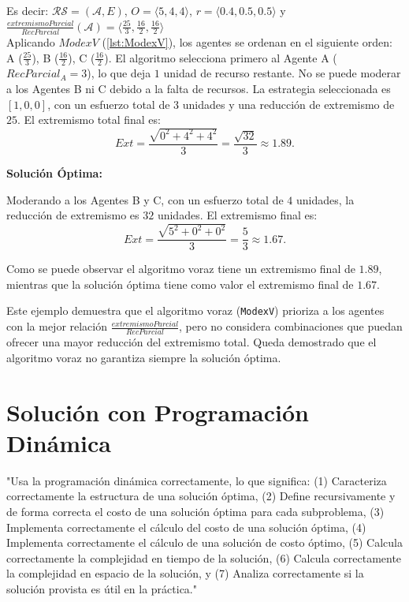 \documentclass[letterpaper,10pt]{article}
\begin{document}
Es decir: $\mathcal{R} \mathcal{S} = (\mathcal{A},E)$, $O=\langle 5,4,4 \rangle$, $r=\langle 0.4, 0.5, 0.5\rangle$ y $\frac{extremismoParcial}{RecParcial}(\mathcal{A})=\langle \frac{25}{3},\frac{16}{2},\frac{16}{2} \rangle $
\\

Aplicando $ModexV$ (\ref{lst:ModexV}), los agentes se ordenan en el siguiente orden: A ($\frac{25}{3}$), B ($\frac{16}{2}$), C ($\frac{16}{2}$). El algoritmo selecciona primero al Agente A (\(RecParcial_A = 3\)), lo que deja \(1\) unidad de recurso restante. No se puede moderar a los Agentes B ni C debido a la falta de recursos. La estrategia seleccionada es \([1, 0, 0]\), con un esfuerzo total de \(3\) unidades y una reducción de extremismo de \(25\). El extremismo total final es:
\[
Ext = \frac{\sqrt{0^2 + 4^2 + 4^2}}{3} = \frac{\sqrt{32}}{3} \approx 1.89.
\]

\textbf{Solución Óptima:}  

Moderando a los Agentes B y C, con un esfuerzo total de \(4\) unidades, la reducción de extremismo es \(32\) unidades. El extremismo final es:
\[
Ext = \frac{\sqrt{5^2 + 0^2 + 0^2}}{3} = \frac{5}{3} \approx 1.67.
\]

Como se puede observar el algoritmo voraz tiene un extremismo final de \(1.89\), mientras que la solución óptima tiene como valor el extremismo final de \(1.67\).
 
Este ejemplo demuestra que el algoritmo voraz (\texttt{ModexV}) prioriza a los agentes con la mejor relación $\frac{extremismoParcial}{RecParcial}$, pero no considera combinaciones que puedan ofrecer una mayor reducción del extremismo total. Queda demostrado que el algoritmo voraz no garantiza siempre la solución óptima.

\section{Solución con Programación Dinámica}
\label{sec:programacion_dinamica}
"Usa la programación dinámica correctamente, lo que significa: (1) Caracteriza correctamente la estructura de una solución óptima, (2) Define recursivamente y de forma correcta el costo de una solución óptima para cada subproblema, (3) Implementa correctamente el cálculo del costo de una solución óptima, (4) Implementa correctamente el cálculo de una solución de costo óptimo, (5) Calcula correctamente la complejidad en tiempo de la solución, (6) Calcula correctamente la complejidad en espacio de la solución, y (7) Analiza correctamente si la solución provista es útil en la práctica."
\end{document}
